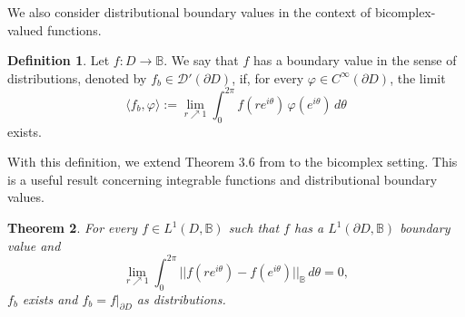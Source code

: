 \documentclass[suppldata]{interact}
\theoremstyle{plain}%
\newtheorem{theorem}{Theorem}[section]
\theoremstyle{definition}
\newtheorem{deff}[theorem]{Definition}
\theoremstyle{remark}
\newcommand{\p}{\partial}
\newcommand{\bc}{\mathbb{B}}
\begin{document}
We also consider distributional boundary values in the context of bicomplex-valued functions. 

\begin{deff}\label{bcbvcircle}Let $f: D \to \bc$. We say that $f$ has a boundary value in the sense of distributions, denoted by $f_b \in \mathcal{D}'(\p D)$, if, for every $\varphi \in C^\infty(\partial D)$, the limit
            \[
             \langle f_b, \varphi \rangle := \lim_{r \nearrow 1} \int_0^{2\pi} f(re^{i\theta}) \, \varphi(e^{i\theta}) \,d\theta
            \]
            exists.
            
\end{deff}

With this definition, we extend Theorem 3.6 from \cite{WB3} to the bicomplex setting. This is a useful result concerning integrable functions and distributional boundary values. 

\begin{theorem}\label{lonedistbv}
For every $f \in L^1(D, \bc)$ such that $f$ has a $L^1(\p D,\bc)$ boundary value and 
\[
    \lim_{r \nearrow 1} \int_0^{2\pi} ||f(re^{i\theta}) - f(e^{i\theta})||_\bc \,d\theta = 0,
\]
$f_b$ exists and $f_b = f|_{\p D}$ as distributions. 
\end{theorem}
\end{document}
